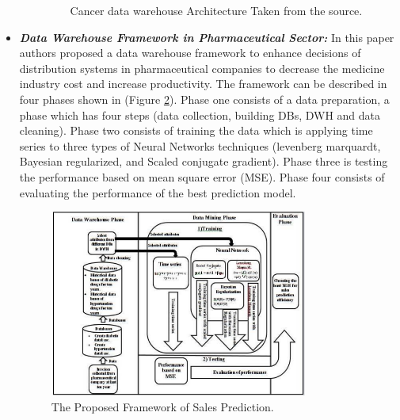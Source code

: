 \begin{itemize}
\begin{enumerate}
\begin{figure}[h!]
      \caption{Cancer data warehouse Architecture Taken from the source.}
      \label{fig:cancersystem}
    \end{figure}
    \end{enumerate}
    \newpage
    \item \textbf{\textit{Data Warehouse Framework in Pharmaceutical Sector:}} In this paper\cite{abd2019proposed} authors proposed a data warehouse framework to enhance decisions of distribution systems in pharmaceutical companies to decrease the medicine industry cost and increase productivity. The framework can be described in four phases shown in (Figure \ref{fig:pharmacysystem}). Phase one consists of a data preparation, a phase which has four steps (data collection, building DBs, DWH and data cleaning). Phase two consists of training the data which is applying time series to three types of Neural Networks techniques (levenberg marquardt, Bayesian regularized, and Scaled conjugate gradient). Phase three is testing the performance based on mean square error (MSE). Phase four consists of evaluating the performance of the best prediction model.
    \begin{figure}[h!]
      \center
      \includegraphics[width=0.80\textwidth]{images/chapter3/relatedwork/pharmacysystem.PNG}
      \caption{The Proposed Framework of Sales Prediction.}
      \label{fig:pharmacysystem}
    \end{figure}
    \newpage
    

\end{itemize}
